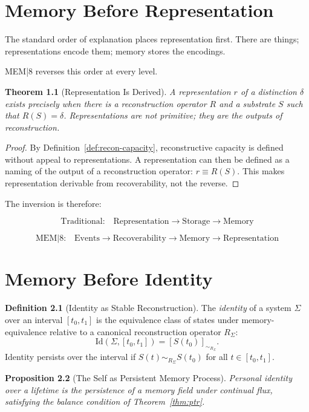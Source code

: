 \documentclass[12pt, oneside]{book}
\theoremstyle{plain}
\newtheorem{theorem}{Theorem}[chapter]
\newtheorem{proposition}[theorem]{Proposition}
\theoremstyle{definition}
\newtheorem{definition}[theorem]{Definition}
\theoremstyle{remark}
\begin{document}
\chapter{Memory Before Representation}

The standard order of explanation places representation
first.
There are things; representations encode them; memory
stores the encodings.

MEM|8 reverses this order at every level.

\begin{theorem}[Representation Is Derived]
A representation $r$ of a distinction $\delta$ exists
precisely when there is a reconstruction operator $R$
and a substrate $S$ such that $R(S) = \delta$.
Representations are not primitive; they are the outputs
of reconstruction.
\end{theorem}

\begin{proof}
By Definition~\ref{def:recon-capacity}, reconstructive
capacity is defined without appeal to representations.
A representation can then be defined as a naming of the
output of a reconstruction operator: $r \equiv R(S)$.
This makes representation derivable from recoverability,
not the reverse.
\end{proof}

\noindent The inversion is therefore:

\[
  \text{Traditional:}\quad
  \text{Representation} \to \text{Storage} \to \text{Memory}
\]

\[
  \text{MEM|8:}\quad
  \text{Events} \to \text{Recoverability} \to \text{Memory} \to \text{Representation}
\]

\chapter{Memory Before Identity}

\begin{definition}[Identity as Stable Reconstruction]
The \emph{identity} of a system $\Sigma$ over an interval
$[t_0, t_1]$ is the equivalence class of states
under memory-equivalence relative to a canonical
reconstruction operator $R_\Sigma$:
\[
  \mathrm{Id}(\Sigma, [t_0, t_1])
  = [S(t_0)]_{\sim_{R_\Sigma}}.
\]
Identity persists over the interval if $S(t) \sim_{R_\Sigma} S(t_0)$
for all $t \in [t_0, t_1]$.
\end{definition}

\begin{proposition}[The Self as Persistent Memory Process]
Personal identity over a lifetime is the persistence of
a memory field under continual flux, satisfying the
balance condition of Theorem~\ref{thm:ptr}.
\end{proposition}
\end{document}

